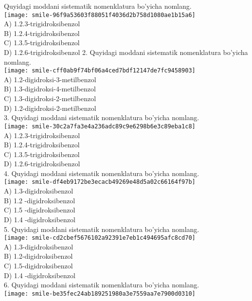   \item Quyidagi moddani sistematik nomenklatura bo'yicha nomlang.\\
\texttt{[image: smile-96f9a53603f88051f4036d2b758d1080ae1b15a6]}\\
A) 1.2.3-trigidroksibenzol\\
B) 1.2.4-trigidroksibenzol\\
C) 1.3.5-trigidroksibenzol\\
D) 1.2.6-trigidroksibenzol
2. Quyidagi moddani sistematik nomenklatura bo'yicha nomlang.\\
\texttt{[image: smile-cff0ab9f74bf06a4ced7bdf12147de7fc9458903]}\\
A) 1.2-digidroksi-3-metilbenzol\\
B) 1.3-digidroksi-4-metilbenzol\\
C) 1.3-digidroksi-2-metilbenzol\\
D) 1.2-digidroksi-2-metilbenzol\\
3. Quyidagi moddani sistematik nomenklatura bo'yicha nomlang.\\
\texttt{[image: smile-30c2a7fa3e4a236adc89c9e6298b6e3c89eba1c8]}\\
A) 1.2.3-trigidroksibenzol\\
B) 1.2.4-trigidroksibenzol\\
C) 1.3.5-trigidroksibenzol\\
D) 1.2.6-trigidroksibenzol\\
4. Quyidagi moddani sistematik nomenklatura bo'yicha nomlang.\\
\texttt{[image: smile-df4eb9172be3ecacb49269e48d5a02c66164f97b]}\\
A) 1.3-digidroksibenzol\\
B) 1.2 -digidroksibenzol\\
C) 1.5 -digidroksibenzol\\
D) 1.4 -digidroksibenzol\\
5. Quyidagi moddani sistematik nomenklatura bo'yicha nomlang.\\
\texttt{[image: smile-cd2cbef5676102a92391e7eb1c494695afc8cd70]}\\
A) 1.3-digidroksibenzol\\
B) 1.2-digidroksibenzol\\
C) 1.5-digidroksibenzol\\
D) 1.4 -digidroksibenzol\\
6. Quyidagi moddani sistematik nomenklatura bo'yicha nomlang.\\
\texttt{[image: smile-be35fec24ab189251980a3e7559aa7e7900d0310]}\\

